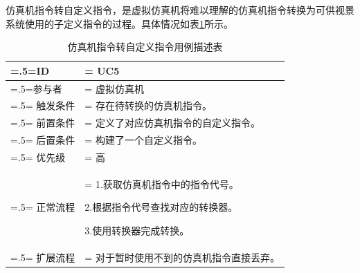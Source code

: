 \par
仿真机指令转自定义指令，是虚拟仿真机将难以理解的仿真机指令转换为可供视景系统使用的子定义指令的过程。具体情况如表\ref{usecase5}所示。
\begin{table}[htbp]
    \begin{center}
        \caption{仿真机指令转自定义指令用例描述表}
        \label{usecase5}
        \renewcommand\arraystretch{1.5}
        \begin{tabularx}{0.8\textwidth}{ 
            | >{\centering\arraybackslash\hsize=.5\hsize\linewidth=\hsize}X 
            | >{\raggedright\arraybackslash\hsize=1.5\hsize\linewidth=\hsize}X 
            | }
            \hline
            \textbf{ID} & \textbf{UC5}\\
            \hline
            参与者 & 虚拟仿真机\\
            \hline
            触发条件 & 存在待转换的仿真机指令。\\
            \hline
            前置条件 & 定义了对应仿真机指令的自定义指令。\\
            \hline
            后置条件 & 构建了一个自定义指令。\\
            \hline
            优先级 & 高\\
            \hline
            正常流程 & 1.获取仿真机指令中的指令代号。\par 2.根据指令代号查找对应的转换器。\par 3.使用转换器完成转换。\\
            \hline
            扩展流程 & 对于暂时使用不到的仿真机指令直接丢弃。\\
            \hline
        \end{tabularx}
    \end{center}
\end{table}

